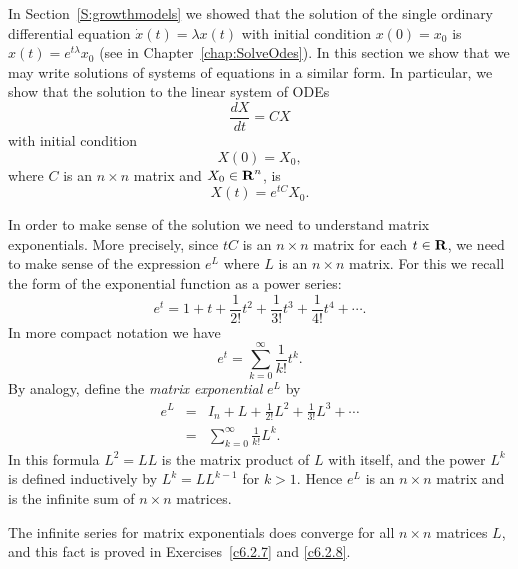 \label{S:Matrixexp} 

In Section~\ref{S:growthmodels} we showed that the solution of the single
ordinary differential equation $\dot x(t) = \lambda x(t)$ with initial
condition $x(0)=x_0$ is $x(t) = e^{t\lambda}x_0$ (see  in
Chapter~\ref{chap:SolveOdes}).  In this section we show that we
may write solutions of systems of equations in a similar form.
In particular, we show that the solution to the linear system of ODEs
\begin{equation}   \label{eq:x=Mx}
\frac{dX}{dt} = CX
\end{equation}
with initial condition
\[
X(0) = X_0,
\]
where $C$ is an $n\times n$ matrix and $X_0\in\mbox{$\bf{R}$}^n$, is
\begin{equation}  \label{matrixsoln}
X(t) = e^{tC}X_0.
\end{equation}

In order to make sense of the solution  we need
to understand matrix exponentials. More precisely, since $tC$ is
an $n\times n$ matrix for each $t\in\mbox{$\bf{R}$}$, we need to make sense
of the expression $e^L$ where $L$ is an $n\times n$ matrix.  For
this we recall the form of the exponential function as a power
series:
\[
     e^t = 1 + t + \frac{1}{2!} t^2 + \frac{1}{3!} t^3
     + \frac{1}{4!} t^4 + \cdots .
\]
In more compact notation we have
\[
     e^t = \sum\limits_{k=0}^\infty \frac{1}{k!} t^k.
\]
By analogy, define the {\em matrix exponential\/}
$e^L$ by
\begin{eqnarray}
e^{L} & = & I_n + L + \frac{1}{2!} L^2 + \frac{1}{3!} L^3 +\cdots
\label{e:expL}\\
      & = & \sum\limits_{k=0}^\infty\frac{1}{k!} L^k. \nonumber
\end{eqnarray}
In this formula $L^2 = LL$ is the matrix product of $L$ with itself, and the
power $L^k$ is defined inductively by $L^k = LL^{k-1}$ for $k>1$.  Hence
$e^L$ is an $n\times n$ matrix and is the infinite sum of $n\times n$
matrices.

   The infinite series for matrix exponentials
 does converge for all $n\times n$ matrices $L$, and this fact
is proved in Exercises~\ref{c6.2.7} and \ref{c6.2.8}.

